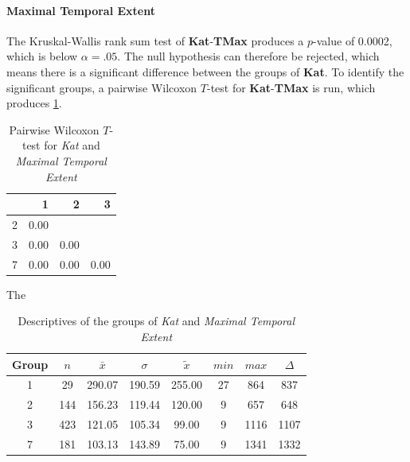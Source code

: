 \paragraph{Maximal Temporal Extent}
The Kruskal-Wallis rank sum test of \textbf{Kat}-\textbf{TMax} produces a $p$-value of 0.0002, which is below $\alpha=.05$. The null hypothesis can therefore be rejected, which means there is a significant difference between the groups of \textbf{Kat}. To identify the significant groups, a pairwise Wilcoxon $T$-test for \textbf{Kat}-\textbf{TMax} is run, which produces \cref{tbl:wilcoxon_baysis_initiator_Kat_TMax}. 
\begin{table}[ht]
	\centering
	\begin{tabular}{rrrr}
		\toprule  
  		& 1 & 2 & 3 \\ 
  		\midrule    
        2 & 0.00 &  &  \\ 
        3 & 0.00 & 0.00 &  \\ 
        7 & 0.00 & 0.00 & 0.00 \\ 
 		\bottomrule
	\end{tabular}
    \caption{Pairwise Wilcoxon $T$-test for \textit{Kat} and \textit{Maximal Temporal Extent}}
    \label{tbl:wilcoxon_baysis_initiator_Kat_TMax}
\end{table}
The 
\begin{table}[ht]
	\centering
	\begin{tabular}{c|c|c|c|c|c|c|c}
		\toprule  
		Group & $n$ & $\bar{x}$ & $\sigma$ & $\tilde{x}$ & $min$ & $max$ & $\Delta$ \\
        \midrule
        1 & 29  & 290.07 & 190.59 & 255.00 & 27 & 864  & 837 \\ 
        2 & 144 & 156.23 & 119.44 & 120.00 & 9  & 657  & 648 \\ 
        3 & 423 & 121.05 & 105.34 & 99.00  & 9  & 1116 & 1107 \\ 
        7 & 181 & 103.13 & 143.89 & 75.00  & 9  & 1341 & 1332 \\ 
 		\bottomrule
	\end{tabular}
    \caption{Descriptives of the groups of \textit{Kat} and \textit{Maximal Temporal Extent}}
    \label{tbl:descriptives_baysis_initiator_Kat_TMax}
\end{table}

